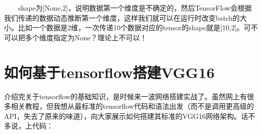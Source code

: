   shape为{[}None,2{]}，说明数据第一个维度是不确定的，然后TensorFlow会根据我们传递的数据动态推断第一个维度，这样我们就可以在运行时改变batch的大小。比如一个数据是2维，一次传递10个数据对应的tensor的shape就是{[}10,2{]}。可不可以把多个维度指定为None？理论上不可以！

\section{如何基于tensorflow搭建VGG16}\label{ux5982ux4f55ux57faux4e8etensorflowux642dux5efavgg16}

​
介绍完关于tensorflow的基础知识，是时候来一波网络搭建实战了。虽然网上有很多相关教程，但我想从最标准的tensorflow代码和语法出发（而不是调用更高级的API，失去了原来的味道），向大家展示如何搭建其标准的VGG16网络架构。话不多说，上代码：

